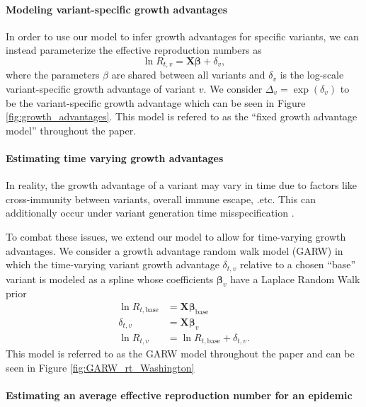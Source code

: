 \documentclass[11pt,oneside,letterpaper]{article}
\renewcommand{\vec}[1]{\boldsymbol{#1}}
\begin{document}
\paragraph{Modeling variant-specific growth advantages}%

In order to use our model to infer growth advantages for specific variants, we can instead parameterize the effective reproduction numbers as
\begin{equation}
\ln R_{t,v} = \vec{X} \vec{\beta} + \delta_{v},
\end{equation}
where the parameters $\beta$ are shared between all variants and $\delta_{v}$ is the log-scale variant-specific growth advantage of variant $v$.
We consider $\Delta_{v} = \exp(\delta_{v})$ to be the variant-specific growth advantage which can be seen in Figure \ref{fig:growth_advantages}.
This model is refered to as the ``fixed growth advantage model'' throughout the paper.

\paragraph{Estimating time varying growth advantages}
In reality, the growth advantage of a variant may vary in time due to factors like cross-immunity between variants, overall immune escape, .etc.
This can additionally occur under variant generation time misspecification \cite{Park2021.05.03.21256545}.

To combat these issues, we extend our model to allow for time-varying growth advantages.
We consider a growth advantage random walk model (GARW) in which the time-varying variant growth advantage $\delta_{t,v}$ relative to a chosen ``base'' variant is modeled as a spline whose coefficients $\vec{\beta}_{v}$ have a Laplace Random Walk prior
\begin{align*}
  \ln R_{t, \text{base}} &= \vec{X} \vec{\beta}_{\text{base}}\\
  \delta_{t, v} &= \vec{X} \vec{\beta}_{v}\\
  \ln R_{t, v} &= \ln R_{t, \text{base}} + \delta_{t, v}.
\end{align*}
This model is referred to as the GARW model throughout the paper and can be seen in Figure \ref{fig:GARW_rt_Washington}

\paragraph{Estimating an average effective reproduction number for an epidemic}
\end{document}
